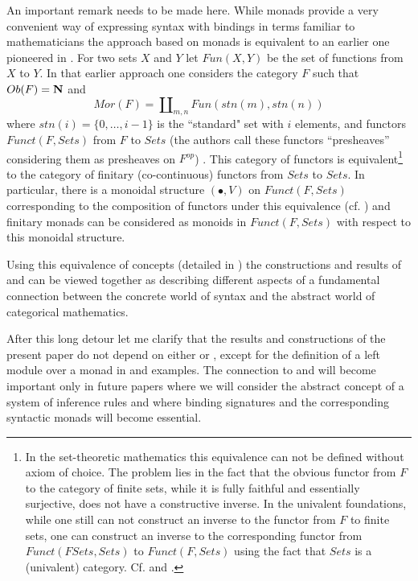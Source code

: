 \documentclass[11pt]{article}
\newcommand{\nn}{{\bf N\rm}}
\begin{document}
An important remark needs to be made here. While monads provide a very convenient way of expressing syntax with bindings in terms familiar to mathematicians the approach based on monads is equivalent to an earlier one pioneered in \cite{FPT}. For two sets $X$ and $Y$ let $Fun(X,Y)$ be the set of functions from $X$ to $Y$.  In that earlier approach one considers the category $F$ such that $Ob(F)=\nn$ and
%
$$Mor(F)=\amalg_{m,n}Fun(stn(m),stn(n))$$
%
where $stn(i)=\{0,\dots,i-1\}$ is the ``standard" set with $i$ elements, and functors $Funct(F,Sets)$ from $F$ to $Sets$ (the authors call these functors ``presheaves'' considering them as presheaves on $F^{op}$) . This category of functors is equivalent\footnote{In the set-theoretic mathematics this equivalence can not be defined without axiom of choice. The problem lies in the fact that the obvious functor from $F$ to the category of finite sets, while it is  fully faithful and essentially surjective, does not have a constructive inverse. In the univalent foundations, while one still can not construct an inverse to the functor from $F$ to finite sets, one can construct an inverse to the corresponding functor from $Funct(FSets,Sets)$ to $Funct(F,Sets)$ using the fact that $Sets$ is a (univalent) category. Cf. \cite{RezkCompletion} and \cite[RezkCompletion library]{UniMath}.} to the category of finitary (co-continuous) functors from $Sets$ to $Sets$. In particular, there is a monoidal structure $(\bullet,V)$ on $Funct(F,Sets)$ corresponding to the composition of functors under this equivalence (cf. \cite[Sec. 3]{FPT}) and finitary monads can be considered as monoids in $Funct(F,Sets)$ with respect to this monoidal structure. 

Using this equivalence of concepts (detailed in \cite{}) the constructions and results of \cite{HM2007} and \cite{FPT} can be viewed together as describing different aspects of a fundamental connection between the concrete world of syntax and the abstract world of categorical mathematics. 

After this long detour let me clarify that the results and constructions of the present paper do not depend on either \cite{HM2007} or \cite{FPT}, except for the definition of a left module over a monad in \cite{HM2007} and examples. The connection to \cite{HM2007} and \cite{FPT} will become important only in future papers where we will consider the abstract concept of a system of inference rules and where binding signatures and the corresponding syntactic monads will become essential. 
\end{document}
